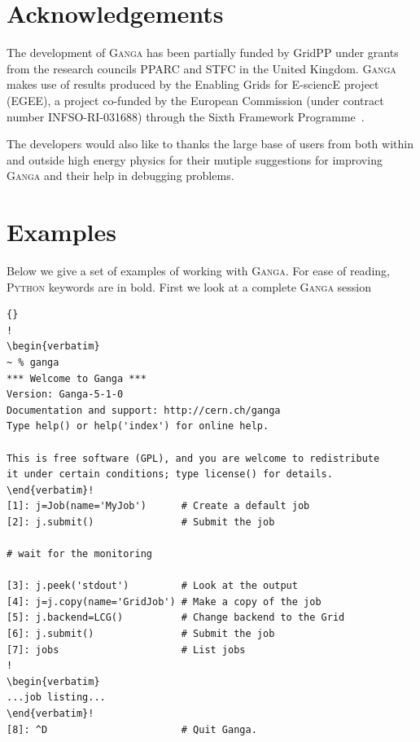 \documentclass{elsart}
\def\ganga {\textsc{Ganga}\xspace}
\def\python {\textsc{Python}\xspace}
\begin{document}
\section{Acknowledgements}
\label{sec:acknowledgements}
The development of \ganga has been partially funded by GridPP under
grants from the research councils PPARC and STFC in the United
Kingdom. \ganga makes use of results produced by the Enabling Grids
for E-sciencE project (EGEE), a project co-funded by the European
Commission (under contract number INFSO-RI-031688) through the Sixth
Framework Programme~\cite{EGEE}.

The developers would also like to thanks the large base of users from both
within and outside high energy physics for their mutiple suggestions for
improving \ganga and their help in debugging problems.


\appendix

\section{Examples}
\label{sec:examples}
Below we give a set of examples of working with \ganga. For ease of reading,
\python keywords are in bold. First we look at a complete \ganga session
\vspace{-2ex}

\tiny
\lstset{language=Python} \lstset{commentstyle=\textit}
\lstset{backgroundcolor=,rulecolor=}
\begin{lstlisting}[escapechar=!]{}
!
\begin{verbatim}
~ % ganga
*** Welcome to Ganga ***
Version: Ganga-5-1-0
Documentation and support: http://cern.ch/ganga
Type help() or help('index') for online help.

This is free software (GPL), and you are welcome to redistribute
it under certain conditions; type license() for details.
\end{verbatim}!
[1]: j=Job(name='MyJob')      # Create a default job
[2]: j.submit()               # Submit the job

# wait for the monitoring

[3]: j.peek('stdout')         # Look at the output
[4]: j=j.copy(name='GridJob') # Make a copy of the job
[5]: j.backend=LCG()          # Change backend to the Grid
[6]: j.submit()               # Submit the job
[7]: jobs                     # List jobs
!
\begin{verbatim}
...job listing...
\end{verbatim}!
[8]: ^D                       # Quit Ganga.
\end{lstlisting}
\normalsize
\end{document}
